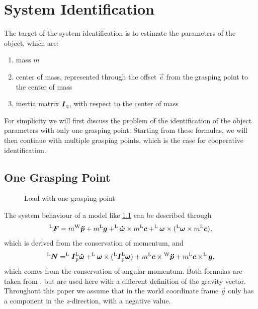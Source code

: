 \chapter{System Identification}
\label{chap:system_identification}

The target of the system identification is to estimate the parameters of the object, which are:
\begin{enumerate}
	\item mass $m$
	\item center of mass, represented through the offset $\vec c$ from the grasping point to the center of mass
	\item inertia matrix $\boldsymbol{I}_{\mathrm{q}}$, with respect to the center of mass
\end{enumerate}

For simplicity we will first discuss the problem of the identification of the object parameters with only one grasping point. Starting from these formulas, we will then continue with multiple grasping points, which is the case for cooperative identification.

\section{One Grasping Point}
\label{sec:one_grasping_point}

\begin{figure}
	\centering
	
	\caption{Load with one grasping point}
	\label{fig:load_one_grasping_point}
\end{figure}

The system behaviour of a model like \ref{fig:load_one_grasping_point} can be described through 
\begin{equation}
	^{\mathrm{L}}\boldsymbol{F} = m {^{\mathrm{W}}}\boldsymbol{\ddot{p}} + m ^{\mathrm{L}}\boldsymbol{g} + ^{\mathrm{L}}\boldsymbol{\dot{\omega}} \times m ^{\mathrm{L}}\boldsymbol{c} + ^{\mathrm{L}}\boldsymbol{\omega} \times (^{\mathrm{L}}\boldsymbol{\omega} \times m ^{\mathrm{L}}\boldsymbol{c}),
	\label{eq:force}
\end{equation}
which is derived from the conservation of momentum, and
\begin{equation}
	^{\mathrm{L}}\boldsymbol{N} = ^{\mathrm{L}}\boldsymbol{I}_{\mathrm{p}} ^{\mathrm{L}}\boldsymbol{\dot{\omega}} + ^{\mathrm{L}}\boldsymbol{\omega} \times (^{\mathrm{L}}\boldsymbol{I}_{\mathrm{p}} ^{\mathrm{L}}\boldsymbol{\omega}) + m ^{\mathrm{L}}\boldsymbol{c} \times {^{\mathrm{W}}}\boldsymbol{\ddot{p}} + m ^{\mathrm{L}}\boldsymbol{c} \times ^{\mathrm{L}}\boldsymbol{g},
	\label{eq:torque}
\end{equation}
which comes from the conservation of angular momentum. Both formulas are taken from \cite{literaturstelle1}, but are used here with a different definition of the gravity vector. Throughout this paper we assume that in the world coordinate frame $\vec g$ only has a component in the $z$-direction, with a negative value.

